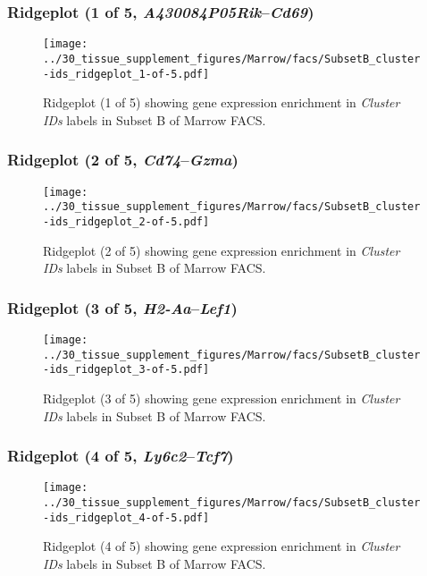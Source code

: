\clearpage

\subsubsection{Ridgeplot (1 of 5, \emph{A430084P05Rik}--\emph{Cd69})}
\begin{figure}[h]
\centering
\texttt{[image: ../30\_tissue\_supplement\_figures/Marrow/facs/SubsetB\_cluster-ids\_ridgeplot\_1-of-5.pdf]}

\caption{ Ridgeplot (1 of 5)  showing gene expression enrichment in \emph{Cluster IDs} labels in Subset B of Marrow FACS. }
\end{figure}


\clearpage

\subsubsection{Ridgeplot (2 of 5, \emph{Cd74}--\emph{Gzma})}
\begin{figure}[h]
\centering
\texttt{[image: ../30\_tissue\_supplement\_figures/Marrow/facs/SubsetB\_cluster-ids\_ridgeplot\_2-of-5.pdf]}

\caption{ Ridgeplot (2 of 5)  showing gene expression enrichment in \emph{Cluster IDs} labels in Subset B of Marrow FACS. }
\end{figure}


\clearpage

\subsubsection{Ridgeplot (3 of 5, \emph{H2-Aa}--\emph{Lef1})}
\begin{figure}[h]
\centering
\texttt{[image: ../30\_tissue\_supplement\_figures/Marrow/facs/SubsetB\_cluster-ids\_ridgeplot\_3-of-5.pdf]}

\caption{ Ridgeplot (3 of 5)  showing gene expression enrichment in \emph{Cluster IDs} labels in Subset B of Marrow FACS. }
\end{figure}


\clearpage

\subsubsection{Ridgeplot (4 of 5, \emph{Ly6c2}--\emph{Tcf7})}
\begin{figure}[h]
\centering
\texttt{[image: ../30\_tissue\_supplement\_figures/Marrow/facs/SubsetB\_cluster-ids\_ridgeplot\_4-of-5.pdf]}

\caption{ Ridgeplot (4 of 5)  showing gene expression enrichment in \emph{Cluster IDs} labels in Subset B of Marrow FACS. }
\end{figure}


